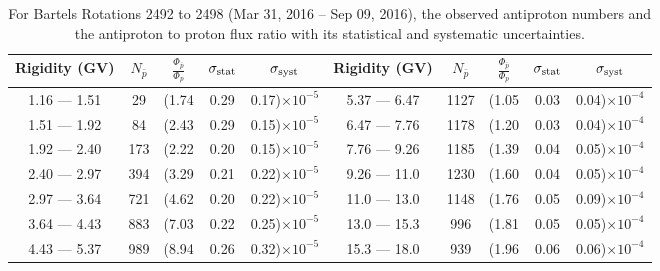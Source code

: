 \begin{table}[p] 
\renewcommand\baselinestretch{1.3}\selectfont
\setlength\tabcolsep{3pt}
\centering
\begin{tabular}{ccccc | ccccc}
\hline
\textbf{Rigidity}  (GV)  & $N_{\bar{p}}$ & $\frac{\Phi_{\bar{p}}}{\Phi_{p}}$ & $\sigma_{\rm{stat}}$ & $\sigma_{\rm{syst}}$ \hspace{1cm}   & \textbf{Rigidity}  (GV)  & $N_{\bar{p}}$ & $\frac{\Phi_{\bar{p}}}{\Phi_{p}}$ & $\sigma_{\rm{stat}}$ & $\sigma_{\rm{syst}}$ \hspace{1cm} \\ 
\hline
1.16 — 1.51   &  29                  &(1.74                          &  0.29              &      0.17)$\times 10^{-5}$  & 5.37 — 6.47                &  1127                    &(1.05                                &  0.03                   &      0.04)$\times 10^{-4}$\\
1.51 — 1.92   &  84                  &(2.43                          &  0.29              &      0.15)$\times 10^{-5}$  & 6.47 — 7.76                &  1178                    &(1.20                                &  0.03                   &      0.04)$\times 10^{-4}$\\
1.92 — 2.40   &  173                &(2.22                          &  0.20              &      0.15)$\times 10^{-5}$  & 7.76 — 9.26                &  1185                    &(1.39                                &  0.04                   &      0.05)$\times 10^{-4}$\\    
2.40 — 2.97   &  394                &(3.29                          &  0.21              &      0.22)$\times 10^{-5}$  & 9.26 — 11.0                &  1230                    &(1.60                                &  0.04                   &      0.05)$\times 10^{-4}$\\    
2.97 — 3.64   &  721                &(4.62                          &  0.20              &      0.22)$\times 10^{-5}$  & 11.0 — 13.0                 &  1148                    &(1.76                                &  0.05                   &      0.09)$\times 10^{-4}$\\
3.64 — 4.43   &  883                &(7.03                          &  0.22              &      0.25)$\times 10^{-5}$  & 13.0 — 15.3               &  996                    &(1.81                                &  0.05                   &      0.05)$\times 10^{-4}$\\
4.43 — 5.37   &  989                &(8.94                          &  0.26              &      0.32)$\times 10^{-5}$  & 15.3 — 18.0               &  939                    &(1.96                                &  0.06                   &      0.06)$\times 10^{-4}$\\
\hline
\end{tabular}
\caption[Antiproton to proton flux ratio for Bartels Rotations 2492 to 2498]{For Bartels Rotations 2492 to 2498 (Mar 31, 2016 – Sep 09, 2016), the observed antiproton numbers and the antiproton to proton flux ratio with its statistical and systematic uncertainties.}
\label{TableOfDependent12}
\end{table}

